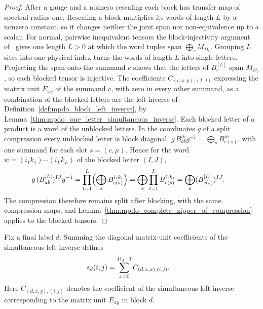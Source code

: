 \begin{proof}\leanok
    After a gauge and a nonzero rescaling each block has transfer map of
    spectral radius one. Rescaling a block multiplies its words of length $L$
    by a nonzero constant, so it changes neither the joint span nor
    non-equivalence up to a scalar. For normal, pairwise inequivalent
    tensors the block-injectivity argument
    of~\cite[lines~317--345]{Cirac2016MPDO_arXiv} gives one length $L>0$ at
    which the word tuples span $\bigoplus_cM_{D_c}$. Grouping $L$ sites into
    one physical index turns the words of length $L$ into single letters.
    Projecting the span onto the summand $c$ shows that the letters of
    $B_c^{[L]}$ span $M_{D_c}$, so each blocked tensor is injective.
    The coefficients $C_{(c,x,y),(I,J)}$ expressing the matrix unit
    $E_{xy}$ of the summand $c$, with zero in every other summand, as a
    combination of the blocked letters are the left inverse of
    Definition~\ref{def:mpdo_block_left_inverse}, by
    Lemma~\ref{thm:mpdo_one_letter_simultaneous_inverse}. Each blocked
    letter of a product is a word of the unblocked letters. In the
    coordinates $g$ of a split compression every unblocked letter is block
    diagonal, $g\,B_{ab}^{ik}g^{-1}=\bigoplus_s B_{c(s)}^{ik}$, with one
    summand for each slot $s=(c,\mu)$. Hence for the word $w=(i_1k_1)\cdots
        (i_Lk_L)$ of the blocked letter $(I,J)$,
    \begin{align}
        g\,(B_{ab}^{[L]})^{IJ}g^{-1}
         & =\prod_{t=1}^{L}\Bigl(\bigoplus_sB_{c(s)}^{i_tk_t}\Bigr)
        =\bigoplus_s\prod_{t=1}^{L}B_{c(s)}^{i_tk_t}
        =\bigoplus_s(B_{c(s)}^{[L]})^{IJ}.
        \notag
    \end{align}
    The compression
    therefore remains split after blocking, with the same compression maps,
    and Lemma~\ref{thm:mpdo_complete_zipper_of_compression} applies to the
    blocked tensors.
\end{proof}

\begin{definition}
    \label{def:mpdo_complete_zipper_final_block_selector}
    \leanok
    Fix a final label $d$. Summing the diagonal matrix-unit coefficients of
    the simultaneous left inverse defines
    \begin{align}
        s_d(i,j)
         & =\sum_{x=0}^{D_d-1}C_{(d,x,x),(i,j)}. \notag
    \end{align}
    Here $C_{(d,x,y),(i,j)}$ denotes the coefficient of the simultaneous
    left inverse corresponding to the matrix unit $E_{xy}$ in block $d$.
\end{definition}


